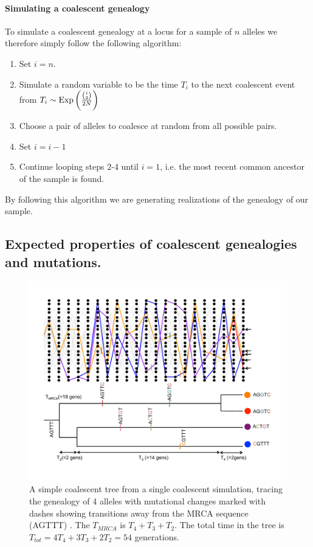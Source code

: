 \paragraph{Simulating a coalescent genealogy}
To simulate a coalescent genealogy at a locus for a sample of $n$ alleles we therefore simply follow the following
algorithm:
\begin{enumerate}
\item Set $i=n$.
\item Simulate a random variable to be the time $T_i$ to the next coalescent event from $T_i \sim
  \text{Exp}\left(\nicefrac{{i \choose
 2}}{2N} \right)$
\item Choose a pair of alleles to coalesce at random from all possible
 pairs.
\item Set $i=i-1$
\item Continue looping steps 2-4 until $i=1$, i.e. the most recent
 common ancestor of the sample is found.
\end{enumerate}
By following this algorithm we are generating realizations of the
genealogy of our sample. \\



\subsection{Expected properties of coalescent genealogies and
  mutations.}

\begin{figure}
\begin{center}
\includegraphics[width= \textwidth]{figures/Coalescent/Coal_w_muts.pdf}
\end{center}
\caption{A simple coalescent tree from a single coalescent simulation, tracing the genealogy of 4 alleles with mutational changes marked with dashes showing transitions away from the MRCA sequence (AGTTT) . The $T_{MRCA}$ is $T_4+T_3+T_2$. The total time in the tree is $T_{tot}=4 T_4+3T_3 + 2T_2= 54$ generations.   } \label{fig:Coal_w_muts}
\end{figure}


